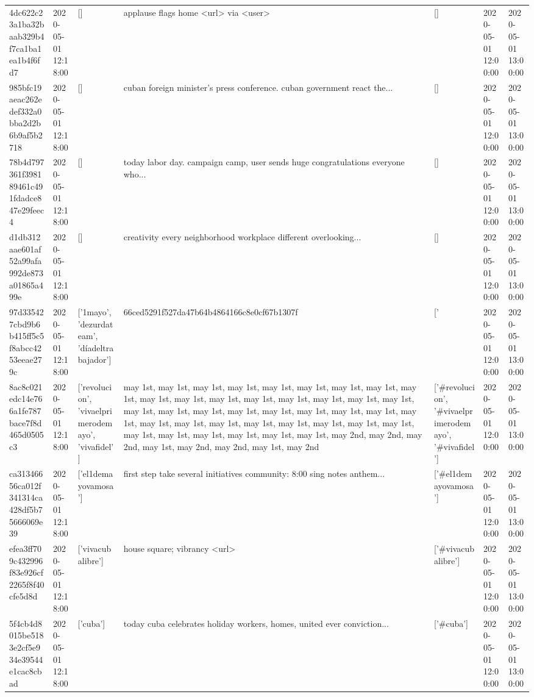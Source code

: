 \begin{tabular}{lllllll}
4dc622c23a1ba32baab329b4f7ca1ba1ea1b4f6fd7 & 2020-05-01 12:18:00 & [] & applause flags home <url> via <user> & [] & 2020-05-01 12:00:00 & 2020-05-01 13:00:00 \\
985bfc19aeac262edef332a0bba2d2b6b9af5b2718 & 2020-05-01 12:18:00 & [] & cuban foreign minister's press conference. cuban government react the... & [] & 2020-05-01 12:00:00 & 2020-05-01 13:00:00 \\
78b4d797361f398189461c491fdadce847e29feec4 & 2020-05-01 12:18:00 & [] & today labor day. campaign camp, user sends huge congratulations everyone who... & [] & 2020-05-01 12:00:00 & 2020-05-01 13:00:00 \\
d1db312aae601af52a99afa992de873a01865a499e & 2020-05-01 12:18:00 & [] & creativity every neighborhood workplace different overlooking... & [] & 2020-05-01 12:00:00 & 2020-05-01 13:00:00 \\
97d335427cbd9b6b415ff5c5f8abcc4253eeae279c & 2020-05-01 12:18:00 & ['1mayo', 'dezurdateam', 'díadeltrabajador'] & 66ced5291f527da47b64b4864166c8e0cf67b1307f & ['#1mayo', '#dezurdateam', '#díadeltrabajador'] & 2020-05-01 12:00:00 & 2020-05-01 13:00:00 \\
8ac8c021edc14e766a1fe787bace7f8d465d0505c3 & 2020-05-01 12:18:00 & ['revolucion', 'vivaelprimerodemayo', 'vivafidel'] & may 1st, may 1st, may 1st, may 1st, may 1st, may 1st, may 1st, may 1st, may 1st, may 1st, may 1st, may 1st, may 1st, may 1st, may 1st, may 1st, may 1st, may 1st, may 1st, may 1st, may 1st, may 1st, may 1st, may 1st, may 1st, may 1st, may 1st, may 1st, may 1st, may 1st, may 1st, may 1st, may 1st, may 1st, may 1st, may 1st, may 1st, may 1st, may 1st, may 1st, may 2nd, may 2nd, may 2nd, may 1st, may 2nd, may 2nd, may 1st, may 2nd & ['#revolucion', '#vivaelprimerodemayo', '#vivafidel'] & 2020-05-01 12:00:00 & 2020-05-01 13:00:00 \\
ca31346656ca012f341314ca428df5b75666069e39 & 2020-05-01 12:18:00 & ['el1demayovamosa'] & first step take several initiatives community: 8:00 sing notes anthem... & ['#el1demayovamosa'] & 2020-05-01 12:00:00 & 2020-05-01 13:00:00 \\
efea3ff709c432996f83e926cf2265f8f40cfe5d8d & 2020-05-01 12:18:00 & ['vivacubalibre'] & house square; vibrancy <url> & ['#vivacubalibre'] & 2020-05-01 12:00:00 & 2020-05-01 13:00:00 \\
5f4cb4d8015be5183e2cf5e934e39544e1cac8cbad & 2020-05-01 12:18:00 & ['cuba'] & today cuba celebrates holiday workers, homes, united ever conviction... & ['#cuba'] & 2020-05-01 12:00:00 & 2020-05-01 13:00:00 \\

\end{tabular}
